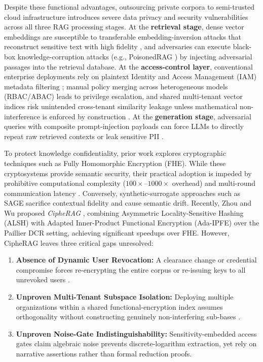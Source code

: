\documentclass[10pt,a4paper]{article}
\begin{document}
Despite these functional advantages, outsourcing private corpora to semi-trusted cloud infrastructure introduces severe data privacy and security vulnerabilities across all three RAG processing stages. At the \textbf{retrieval stage}, dense vector embeddings are susceptible to transferable embedding-inversion attacks that reconstruct sensitive text with high fidelity \cite{zhou2026cipherag}, and adversaries can execute black-box knowledge-corruption attacks (e.g., PoisonedRAG \cite{zou2025poisonedrag}) by injecting adversarial passages into the retrieval database. At the \textbf{access-control layer}, conventional enterprise deployments rely on plaintext Identity and Access Management (IAM) metadata filtering \cite{jeong2025permissionaware}; manual policy merging across heterogeneous models (RBAC/ABAC) leads to privilege escalation, and shared multi-tenant vector indices risk unintended cross-tenant similarity leakage unless mathematical non-interference is enforced by construction \cite{yang2024cpipfe}. At the \textbf{generation stage}, adversarial queries with composite prompt-injection payloads can force LLMs to directly repeat raw retrieved contexts or leak sensitive PII \cite{zeng2024good, zhang2025beyondtext}.

To protect knowledge confidentiality, prior work explores cryptographic techniques such as Fully Homomorphic Encryption (FHE). While these cryptosystems provide semantic security, their practical adoption is impeded by prohibitive computational complexity ($100\times$--$1000\times$ overhead) and multi-round communication latency \cite{gentry2009fhe, hou2026ciphergpt}. Conversely, synthetic-surrogate approaches such as SAGE \cite{zeng2025mitigating} sacrifice contextual fidelity and cause semantic drift. Recently, Zhou and Wu proposed \textit{CipheRAG} \cite{zhou2026cipherag}, combining Asymmetric Locality-Sensitive Hashing (ALSH) \cite{shrivastava2014alsh} with Adapted Inner-Product Functional Encryption (Ada-IPFE) \cite{yang2022privacypreserving} over the Paillier DCR setting, achieving significant speedups over FHE. However, CipheRAG leaves three critical gaps unresolved:
\begin{enumerate}
    \item \textbf{Absence of Dynamic User Revocation:} A clearance change or credential compromise forces re-encrypting the entire corpus or re-issuing keys to all unrevoked users \cite{ge2024attributebased}.
    \item \textbf{Unproven Multi-Tenant Subspace Isolation:} Deploying multiple organizations within a shared functional-encryption index assumes orthogonality without constructing genuinely non-interfering sub-bases \cite{yang2024cpipfe}.
    \item \textbf{Unproven Noise-Gate Indistinguishability:} Sensitivity-embedded access gates claim algebraic noise prevents discrete-logarithm extraction, yet rely on narrative assertions rather than formal reduction proofs.
\end{enumerate}
\end{document}
